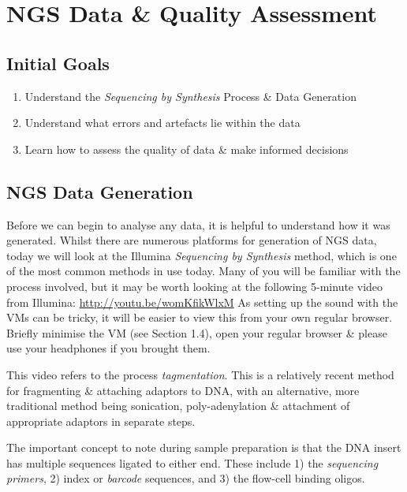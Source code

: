 \chapter{NGS Data \& Quality Assessment}

\section{Initial Goals}

\begin{enumerate}
\item Understand the \textit{Sequencing by Synthesis} Process \& Data Generation \\
\item Understand what errors and artefacts lie within the data \\
\item Learn how to assess the quality of data \& make informed decisions \\
\end{enumerate}

\section{NGS Data Generation}
\begin{steps}
Before we can begin to analyse any data, it is helpful to understand how it was generated.
Whilst there are numerous platforms for generation of NGS data, today we will look at the Illumina \textit{Sequencing by Synthesis} method, which is one of the most common methods in use today.
Many of you will be familiar with the process involved, but it may be worth looking at the following 5-minute video from Illumina: \url{http://youtu.be/womKfikWlxM} 
As setting up the sound with the VMs can be tricky, it will be easier to view this from your own regular browser.
Briefly minimise the VM (see Section 1.4), open your regular browser \& please use your headphones if you brought them. \\
\end{steps}

\begin{note}
This video refers to the process \textit{tagmentation}.
This is a relatively recent method for fragmenting \& attaching adaptors to DNA, with an alternative, more traditional method being sonication, poly-adenylation \& attachment of appropriate adaptors in separate steps.
\end{note}

\begin{information}
The important concept to note during sample preparation is that the DNA insert has multiple sequences ligated to either end.
These include 1) the \textit{sequencing primers}, 2) index or \textit{barcode} sequences, and 3) the flow-cell binding oligos.
\end{information}

